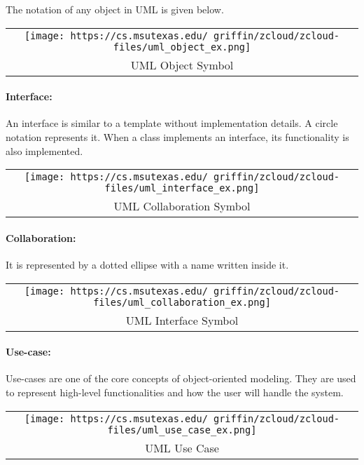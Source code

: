 \documentclass[
]{article}
\begin{document}
The notation of any object in UML is given below.

\begin{longtable}[]{@{}c@{}}
\toprule
\endhead
\texttt{[image: https://cs.msutexas.edu/~griffin/zcloud/zcloud-files/uml\_object\_ex.png]}\tabularnewline
UML Object Symbol\tabularnewline
\bottomrule
\end{longtable}

\hypertarget{interface}{%
\paragraph{Interface:}\label{interface}}

An interface is similar to a template without implementation details. A
circle notation represents it. When a class implements an interface, its
functionality is also implemented.

\begin{longtable}[]{@{}c@{}}
\toprule
\endhead
\texttt{[image: https://cs.msutexas.edu/~griffin/zcloud/zcloud-files/uml\_interface\_ex.png]}\tabularnewline
UML Collaboration Symbol\tabularnewline
\bottomrule
\end{longtable}

\hypertarget{collaboration}{%
\paragraph{Collaboration:}\label{collaboration}}

It is represented by a dotted ellipse with a name written inside it.

\begin{longtable}[]{@{}c@{}}
\toprule
\endhead
\texttt{[image: https://cs.msutexas.edu/~griffin/zcloud/zcloud-files/uml\_collaboration\_ex.png]}\tabularnewline
UML Interface Symbol\tabularnewline
\bottomrule
\end{longtable}

\hypertarget{use-case}{%
\paragraph{Use-case:}\label{use-case}}

Use-cases are one of the core concepts of object-oriented modeling. They
are used to represent high-level functionalities and how the user will
handle the system.

\begin{longtable}[]{@{}c@{}}
\toprule
\endhead
\texttt{[image: https://cs.msutexas.edu/~griffin/zcloud/zcloud-files/uml\_use\_case\_ex.png]}\tabularnewline
UML Use Case\tabularnewline
\bottomrule
\end{longtable}
\end{document}
